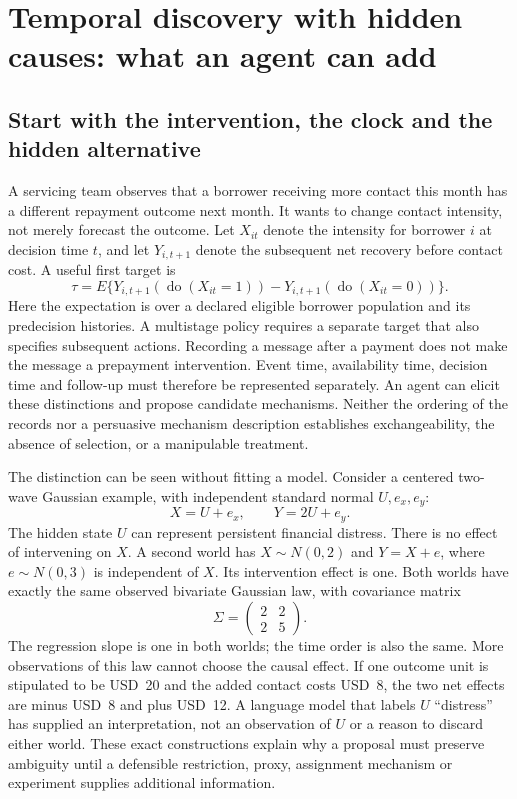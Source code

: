 \section{Temporal discovery with hidden causes: what an agent can add}
\label{exec15:latent-temporal}

\subsection{Start with the intervention, the clock and the hidden alternative}

A servicing team observes that a borrower receiving more contact this month
has a different repayment outcome next month. It wants to change contact
intensity, not merely forecast the outcome. Let $X_{it}$ denote the intensity
for borrower $i$ at decision time $t$, and let $Y_{i,t+1}$ denote the subsequent
net recovery before contact cost. A useful first target is
\[
 \tau=E\{Y_{i,t+1}(\operatorname{do}(X_{it}=1))
             -Y_{i,t+1}(\operatorname{do}(X_{it}=0))\}.
\]
Here the expectation is over a declared eligible borrower population and its
predecision histories. A multistage policy requires a separate target that
also specifies subsequent actions. Recording a message after a payment does
not make the message a prepayment intervention. Event time, availability time,
decision time and follow-up must therefore be represented separately. An agent
can elicit these distinctions and propose candidate mechanisms. Neither the
ordering of the records nor a persuasive mechanism description establishes
exchangeability, the absence of selection, or a manipulable treatment.
\citep{v12_la_2606_23608,exec15_latent_design}

The distinction can be seen without fitting a model. Consider a centered
two-wave Gaussian example, with independent standard normal $U,e_x,e_y$:
\[
 X=U+e_x,\qquad Y=2U+e_y.
\]
The hidden state $U$ can represent persistent financial distress. There is no
effect of intervening on $X$. A second world has $X\sim N(0,2)$ and
$Y=X+e$, where $e\sim N(0,3)$ is independent of $X$. Its intervention effect
is one. Both worlds have exactly the same observed bivariate Gaussian law,
with covariance matrix
\[
 \Sigma=\begin{pmatrix}2&2\\2&5\end{pmatrix}.
\]
The regression slope is one in both worlds; the time order is also the same.
More observations of this law cannot choose the causal effect. If one outcome
unit is stipulated to be USD~20 and the added contact costs USD~8, the two net
effects are minus USD~8 and plus USD~12. A language model that labels $U$
``distress'' has supplied an interpretation, not an observation of $U$ or a
reason to discard either world. These exact constructions explain why a
proposal must preserve ambiguity until a defensible restriction, proxy,
assignment mechanism or experiment supplies additional information.
\citep{exec15_latent_exact}

